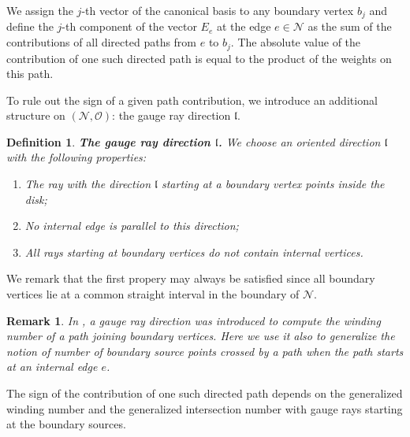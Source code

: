 \documentclass[11pt]{amsart}
\theoremstyle{plain}
\numberwithin{equation}{section}
\newtheorem{remark}{Remark}[subsection]
\newtheorem{definition}{Definition}[subsection]
\begin{document}
We assign the $j$-th vector of the canonical basis to any boundary vertex $b_j$ and define the $j$-th component of the vector $E_e$ at the edge $e\in \mathcal N$ as the sum of the contributions of all directed paths from $e$ to $b_j$. The absolute value of the contribution of one such directed path is equal to the product of the weights on this path. 

\begin{figure}
\end{figure}

To rule out the sign of a given path contribution, we introduce an additional structure on $({\mathcal N}, \mathcal O)$: the gauge ray direction $\mathfrak{l}$. 

\begin{definition}\label{def:gauge_ray}\textbf{The gauge ray direction $\mathfrak{l}$.}
We choose an oriented direction ${\mathfrak l}$ with the following properties:
\begin{enumerate}
\item The ray with the direction ${\mathfrak l}$ starting at a boundary vertex points inside the disk; 
\item No internal edge is parallel to this direction;
\item All rays starting at boundary vertices do not contain internal vertices.
\end{enumerate}
\end{definition}

We remark that the first propery may always be satisfied since all boundary vertices lie at a common straight interval in the boundary of $\mathcal N$.
\begin{remark}
In \cite{GSV}, a gauge ray direction was introduced to compute the winding number of a path joining boundary vertices. Here we use it also to generalize the notion of number of boundary source points crossed by a path when the path starts at an internal edge $e$. 
\end{remark}

The sign of the contribution of one such directed path depends on the generalized winding number and the generalized intersection number with gauge rays starting at the boundary sources. 
\end{document}
